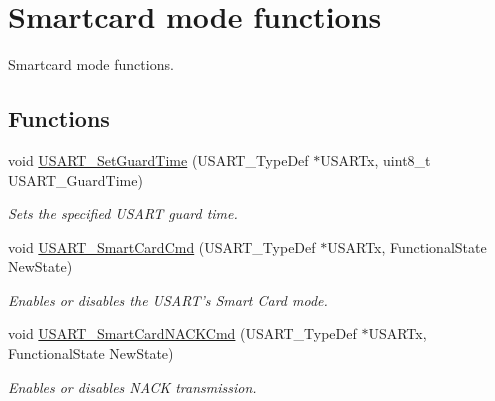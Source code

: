 \hypertarget{group___u_s_a_r_t___group6}{\section{Smartcard mode functions}
\label{group___u_s_a_r_t___group6}
}


Smartcard mode functions.  


\subsection*{Functions}
\begin{DoxyCompactItemize}
\item 
void \hyperlink{group___u_s_a_r_t___group6_gac4a35c6acd71ae7e0d67c1f03f0a8777}{U\-S\-A\-R\-T\-\_\-\-Set\-Guard\-Time} (U\-S\-A\-R\-T\-\_\-\-Type\-Def $\ast$U\-S\-A\-R\-Tx, uint8\-\_\-t U\-S\-A\-R\-T\-\_\-\-Guard\-Time)
\begin{DoxyCompactList}\small\item\em Sets the specified U\-S\-A\-R\-T guard time. \end{DoxyCompactList}\item 
void \hyperlink{group___u_s_a_r_t___group6_gabd1347e244c623447151ba3a5e986c5f}{U\-S\-A\-R\-T\-\_\-\-Smart\-Card\-Cmd} (U\-S\-A\-R\-T\-\_\-\-Type\-Def $\ast$U\-S\-A\-R\-Tx, Functional\-State New\-State)
\begin{DoxyCompactList}\small\item\em Enables or disables the U\-S\-A\-R\-T's Smart Card mode. \end{DoxyCompactList}\item 
void \hyperlink{group___u_s_a_r_t___group6_ga62e22f47e38aa53f2edce8771f7a5dfa}{U\-S\-A\-R\-T\-\_\-\-Smart\-Card\-N\-A\-C\-K\-Cmd} (U\-S\-A\-R\-T\-\_\-\-Type\-Def $\ast$U\-S\-A\-R\-Tx, Functional\-State New\-State)
\begin{DoxyCompactList}\small\item\em Enables or disables N\-A\-C\-K transmission. \end{DoxyCompactList}\end{DoxyCompactItemize}


